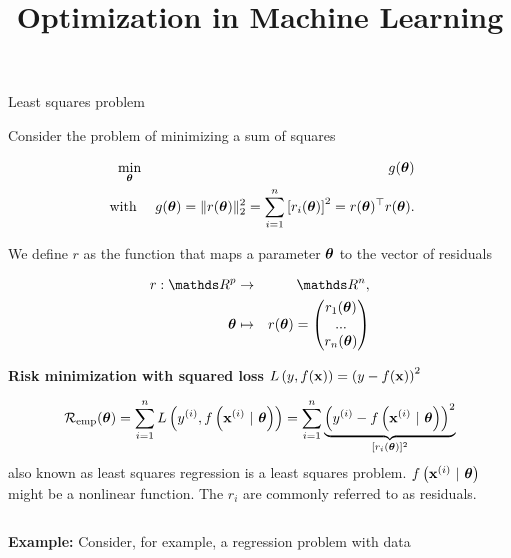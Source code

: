 \documentclass[11pt,compress,t,notes=noshow, xcolor=table]{beamer}
\title{Optimization in Machine Learning}
\date{}
\begin{document}
\sloppy

\begin{vbframe}{Least squares problem}


Consider the problem of minimizing a sum of squares

\begin{eqnarray*}
	\min_{\bm{\theta}} &&g(\bm{\theta})  \\ \text{ with } && g(\bm{\theta}) = \|r(\bm{\theta})\|_2^2 = \sum_{i = 1}^n \left[r_i(\bm{\theta})\right]^2 = r(\bm{\theta})^\top r(\bm{\theta}). 
\end{eqnarray*}

We define $r$ as the function that maps a parameter $\bm{\theta}$ to the vector of residuals

\begin{eqnarray*}
	r: \R^p &\to& \R^n, \\
	\thetab &\mapsto& r(\thetab) = \begin{pmatrix} r_1(\thetab) \\ ... \\ r_n(\thetab)\end{pmatrix}
\end{eqnarray*}

\framebreak 

\textbf{Risk minimization with squared loss} $L\left(y, f(\mathbf{x})\right) = \left(y - f(\mathbf{x})\right)^2$

$$
	\risket = \sumin \Lxyit = \sumin \underbrace{\left(\yi - \fxit \right)^2}_{[r_i(\thetab)]^2} %
$$
also known as least squares regression is a least squares problem. $f\left(\mathbf{x}^{(i)} ~|~ \bm{\theta}\right)$ might be a nonlinear function. The $r_i$ are commonly referred to as residuals.

\vspace*{0.3cm} 

\begin{columns}
\begin{column}{0.55\textwidth}
\textbf{Example:} Consider, for example, a regression problem with data


\end{column}
\end{columns}
\end{vbframe}
\end{document}
